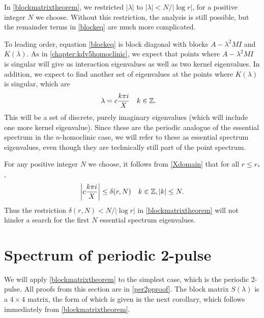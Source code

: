 \documentclass[thesis.tex]{subfiles}
\begin{document}
\begin{remark}
In \cref{blockmatrixtheorem}, we restricted $|\lambda|$ to $|\lambda| < N/|\log r|$, for a positive integer $N$ we choose. Without this restriction, the analysis is still possible, but the remainder terms in \cref{blockeq} are much more complicated.
\end{remark}

To leading order, equation \cref{blockeq} is block diagonal with blocks $A - \lambda^2 MI$ and $K(\lambda)$. As in \cref{chapter:kdv5homoclinic}, we expect that points where $A - \lambda^2 MI$ is singular will give us interaction eigenvalues as well as two kernel eigenvalues. In addition, we expect to find another set of eigenvalues at the points where $K(\lambda)$ is singular, which are
\begin{align*}
\lambda &= c\frac{k \pi i}{X} && k \in \mathbb{Z}.
\end{align*}
This will be a set of discrete, purely imaginary eigenvalues (which will include one more kernel eigenvalue). Since these are the periodic analogue of the essential spectrum in the $n$-homoclinic case, we will refer to these as essential spectrum eigenvalues, even though they are technically still part of the point spectrum. 

\begin{remark}
For any positive integer $N$ we choose, it follows from \cref{Xdomain} that for all $r \leq r_*$,
\begin{align*}
\left| c\frac{k \pi i}{X} \right| \leq \delta(r,N) && k \in \mathbb{Z}, |k|\leq N.
\end{align*}
Thus the restriction $\delta(r,N) < N/|\log r|$ in \cref{blockmatrixtheorem} will not hinder a search for the first $N$ essential spectrum eigenvalues.
\end{remark}

\section{Spectrum of periodic 2-pulse}\label{sec:per2peig}

We will apply \cref{blockmatrixtheorem} to the simplest case, which is the periodic 2-pulse. All proofs from this section are in \cref{per2pproof}. The block matrix $S(\lambda)$ is a $4\times 4$ matrix, the form of which is given in the next corollary, which follows immediately from \cref{blockmatrixtheorem}.
\end{document}
